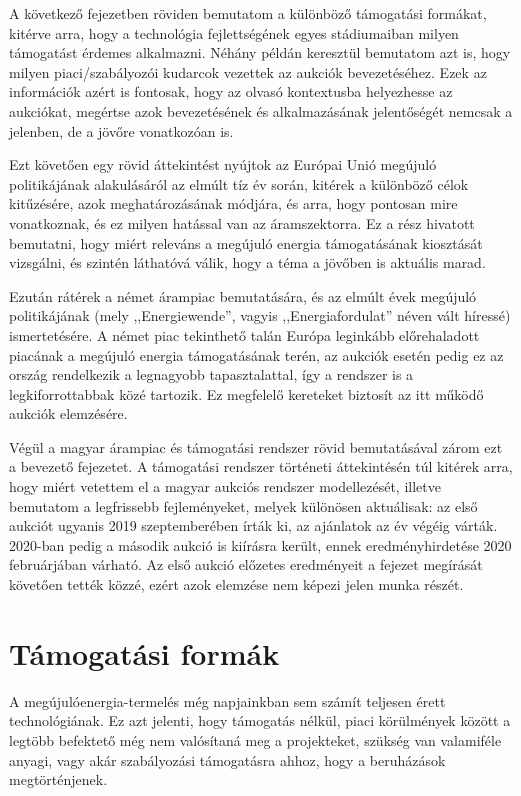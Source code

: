 \documentclass[twoside, magyar, showtrims]{corvinusphd}
\theoremstyle{plain}
\theoremstyle{remark}
\theoremstyle{definition}
\begin{document}
A következő fejezetben röviden bemutatom a különböző
támogatási formákat, kitérve arra, hogy a technológia fejlettségének
egyes stádiumaiban milyen támogatást érdemes alkalmazni. 
Néhány példán keresztül bemutatom azt is, hogy milyen
piaci/szabályozói kudarcok vezettek az aukciók bevezetéséhez.
Ezek az információk azért is fontosak, 
hogy az olvasó kontextusba helyezhesse az aukciókat,
megértse azok bevezetésének és alkalmazásának
jelentőségét nemcsak a jelenben, de 
a jövőre vonatkozóan is.

Ezt követően egy rövid áttekintést nyújtok az Európai Unió
megújuló politikájának alakulásáról az elmúlt tíz év során, kitérek
a különböző célok kitűzésére, azok meghatározásának módjára, 
és arra, hogy pontosan mire vonatkoznak, és ez milyen hatással
van az áramszektorra. Ez a rész hivatott bemutatni,
hogy miért releváns a megújuló energia támogatásának kiosztását
vizsgálni, és szintén láthatóvá válik, hogy a téma a jövőben is
aktuális marad.

Ezután rátérek a német árampiac bemutatására, és az elmúlt évek
megújuló politikájának (mely ,,Energiewende'', vagyis ,,Energiafordulat''
néven vált híressé) ismertetésére. A német piac tekinthető talán
Európa leginkább előrehaladott piacának a megújuló energia
támogatásának terén, az aukciók esetén pedig ez az ország
rendelkezik a legnagyobb tapasztalattal, így a rendszer is a legkiforrottabbak
közé tartozik. Ez megfelelő kereteket biztosít az itt működő
aukciók elemzésére.

Végül a magyar árampiac és támogatási rendszer rövid bemutatásával
zárom ezt a bevezető fejezetet. A támogatási rendszer történeti
áttekintésén túl kitérek arra, hogy miért vetettem el a magyar
aukciós rendszer modellezését, illetve bemutatom a legfrissebb
fejleményeket, melyek különösen aktuálisak:
az első aukciót ugyanis 2019 szeptemberében írták ki, az ajánlatok
az év végéig várták. 2020-ban pedig a második aukció is
kiírásra került, ennek eredményhirdetése 2020 februárjában várható.
Az első aukció előzetes eredményeit
a fejezet megírását követően tették közzé,
ezért azok elemzése nem képezi jelen munka részét.

\section{Támogatási formák}

A megújulóenergia-termelés még napjainkban sem számít 
teljesen érett technológiának. Ez azt jelenti, hogy támogatás 
nélkül, piaci körülmények között a legtöbb befektető még
nem valósítaná meg a projekteket, szükség van valamiféle
anyagi, vagy akár szabályozási támogatásra ahhoz, hogy
a beruházások megtörténjenek.
\end{document}
